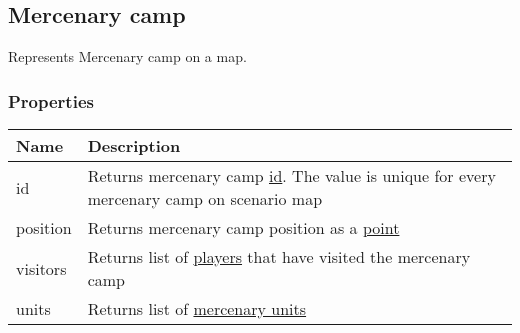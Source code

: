 \subsection{Mercenary camp}
\label{Mercenary}
Represents Mercenary camp on a map.
\subsubsection{Properties}
\begin{center}
\begin{tabularx}{\linewidth}{| l | X |}
\hline
\textbf{Name} & \textbf{Description} \\
\hline
id & Returns mercenary camp \hyperref[Id]{id}. The value is unique for every mercenary camp on scenario map\\
\hline
position & Returns mercenary camp position as a \hyperref[Point]{point}\\
\hline
visitors & Returns list of \hyperref[Player]{players} that have visited the mercenary camp\\
\hline
units & Returns list of \hyperref[MercenaryUnit]{mercenary units}\\
\hline
\end{tabularx}
\end{center}